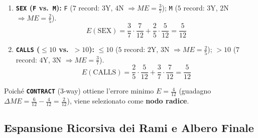 \begin{enumerate}
    \item \textbf{\texttt{SEX} (\texttt{F} vs.\ \texttt{M}):} \texttt{F} ($7$ record: $3$Y, $4$N $\Rightarrow ME = \frac{3}{7}$); \texttt{M} ($5$ record: $3$Y, $2$N $\Rightarrow ME = \frac{2}{5}$).
    \begin{equation*}
        E(\text{SEX}) = \frac{3}{7} \cdot \frac{7}{12} + \frac{2}{5} \cdot \frac{5}{12} = \frac{5}{12}
    \end{equation*}
    \item \textbf{\texttt{CALLS} ($\le 10$ vs.\ $> 10$):} $\le 10$ ($5$ record: $2$Y, $3$N $\Rightarrow ME = \frac{2}{5}$); $> 10$ ($7$ record: $4$Y, $3$N $\Rightarrow ME = \frac{3}{7}$).
    \begin{equation*}
        E(\text{CALLS}) = \frac{2}{5} \cdot \frac{5}{12} + \frac{3}{7} \cdot \frac{7}{12} = \frac{5}{12}
    \end{equation*}
\end{enumerate}

Poich\'e \textbf{\texttt{CONTRACT}} (3-way) ottiene l'errore minimo $E = \frac{4}{12}$ (guadagno $\Delta ME = \frac{6}{12} - \frac{4}{12} = \frac{2}{12}$), viene selezionato come \textbf{nodo radice}.

\FloatBarrier
\subsection{Espansione Ricorsiva dei Rami e Albero Finale}
\label{subsec:dm-dt-sim-expansion}


